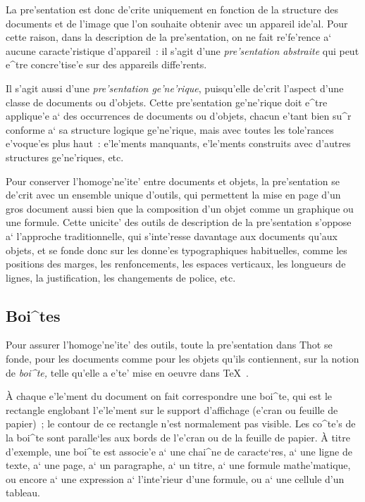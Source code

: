 {La pre'sentation est donc de'crite uniquement en fonction de la structure des
documents et de l'image que l'on souhaite obtenir avec un appareil ide'al.
Pour cette raison, dans la description de la pre'sentation, on ne
fait re'fe'rence a` aucune caracte'ristique d'appareil~: il s'agit d'une
{\em pre'sentation abstraite} qui peut e^tre concre'tise'e sur des
appareils diffe'rents.

Il s'agit aussi d'une {\em pre'sentation ge'ne'rique}, puisqu'elle de'crit l'aspect
d'une classe de documents ou d'objets. Cette pre'sentation ge'ne'rique doit
e^tre applique'e a` des occurrences de documents ou d'objets, chacun e'tant
bien su^r conforme a` sa structure logique ge'ne'rique, mais avec toutes les
tole'rances e'voque'es plus haut~: e'le'ments manquants, e'le'ments construits
avec d'autres structures ge'ne'riques, etc.

Pour conserver l'homoge'ne'ite' entre documents et objets, la pre'sentation
se de'crit avec un ensemble unique d'outils, qui permettent la mise en page
d'un gros document aussi bien que la composition d'un objet comme un
graphique ou une formule. Cette unicite' des outils de description de la
pre'sentation s'oppose a` l'approche traditionnelle, qui s'inte'resse davantage
aux documents qu'aux objets, et se fonde donc sur les donne'es typographiques
habituelles, comme les positions des marges, les renfoncements, les espaces
verticaux, les longueurs de lignes, la justification, les changements de
police, etc.

\subsection{Boi^tes}

Pour assurer l'homoge'ne'ite' des outils, toute la pre'sentation dans Thot se
fonde, pour les documents comme pour les objets qu'ils contiennent, sur la
notion de {\em boi^te,} telle qu'elle a e'te' mise en oeuvre dans \TeX\ .

\`{A} chaque e'le'ment du document on fait correspondre une boi^te,
qui est le rectangle englobant l'e'le'ment sur le support d'affichage
(e'cran ou feuille de papier)~; le contour de ce rectangle n'est
normalement pas visible.
Les co^te's de la boi^te sont paralle`les aux bords de l'e'cran ou de la
feuille de papier. \`{A} titre d'exemple, une boi^te est associe'e a` une
chai^ne de caracte`res, a` une ligne de texte, a` une page, a` un paragraphe,
a` un titre, a` une formule mathe'matique, ou encore a` une expression a`
l'inte'rieur d'une formule, ou a` une cellule d'un tableau.

}
